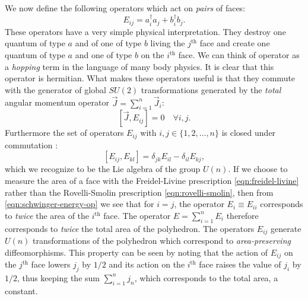 \documentclass[twocolumn,draft,aps,nofootinbib,nobibnotes,final]{revtex4-2}
\newcommand{\supersc}[1]{$^{\textrm{#1}}$}
\begin{document}
We now define the following operators which act on \textit{pairs} of faces:
\begin{equation}\label{eqn:u-n-generators}
	E_{ij} = a_i^\dagger a_j + b^\dagger_i b_j.
\end{equation}
These operators have a very simple physical interpretation. They destroy one quantum of type $ a $ and of one of type $ b $ living the $ j $\supersc{th} face and create one quantum of type $ a $ and one of type $ b $ on the $ i $\supersc{th} face. We can think of operator as a \textit{hopping} term in the language of many body physics. It is clear that this operator is hermitian. What makes these operators useful is that they commute with the generator of global $ SU(2) $ transformations generated by the \textit{total} angular momentum operator $ \vec{J} = \sum_{i=1}^n \vec J_i $:
\begin{equation}\label{eqn:e-j-commutator}
	\left[\vec{J}, E_{ij} \right] = 0 \quad \forall i,j.
\end{equation}
Furthermore the set of operators $ E_{ij} $ with $ i,j \in \{1,2,\ldots,n\} $ is closed under commutation \cite{Freidel2010UN-Coherent}:
\begin{equation}\label{eqn:u-n-algebra}
	[E_{ij}, E_{kl}] = \delta_{jk} E_{il} - \delta_{il} E_{kj},
\end{equation}
which we recognize to be the Lie algebra of the group $ U(n) $. If we choose to measure the area of a face with the Freidel-Livine prescription \eqref{eqn:freidel-livine} rather than the Rovelli-Smolin prescription \eqref{eqn:rovelli-smolin}, then from \eqref{eqn:schwinger-energy-op} we see that for $ i=j $, the operator $ E_i \equiv E_{ii} $ corresponds to \textit{twice} the area of the $ i $\supersc{th} face. The operator $ E = \sum_{i=1}^{n} E_i $ therefore corresponds to \textit{twice} the total area of the polyhedron. The operators $ E_{ij} $ generate $ U(n) $ transformations of the polyhedron which correspond to \textit{area-preserving} diffeomorphisms. This property can be seen by noting that the action of $ E_{ij} $ on the $ j $\supersc{th} face lowers $ j_j $ by $ 1/2 $ and its action on the $ i $\supersc{th} face raises the value of $ j_i $ by $ 1/2 $, thus keeping the sum $ \sum_{i=1}^{n} j_n $, which corresponds to the total area, a constant.
\end{document}
